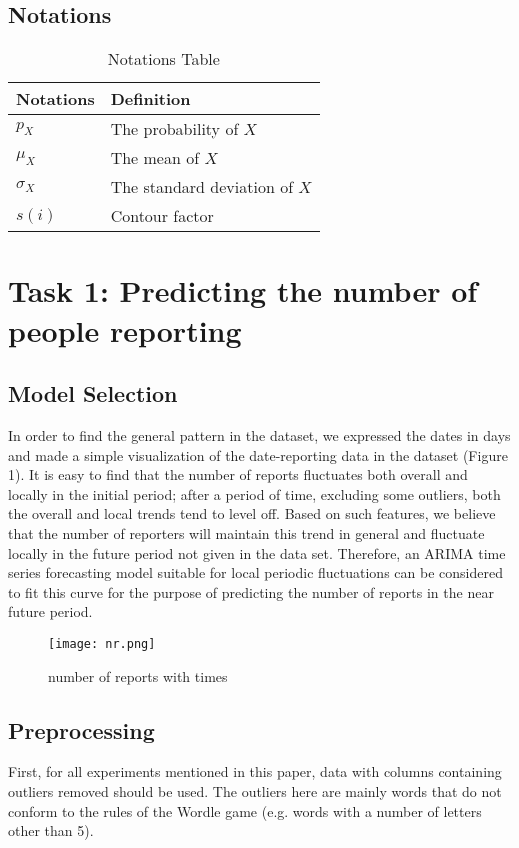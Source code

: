 \documentclass[12pt]{article}  %
\begin{document}
\subsection{Notations}
\begin{table}[H]
	\centering
	\begin{tabular}{ll}
		\hline
		\hline
		\multicolumn{1}{c}{\textbf{Notations}} & \textbf{Definition}\\ \hline
		$p_{X}$ &  The probability of $X$              \\                     
		$\mu_{X}$  & The mean of $X$              \\                     
		$\sigma_{X}$ &  The standard deviation of $X$              \\  
		$s(i)$ & Contour factor \\                   
		\hline
		\hline
	\end{tabular}
	\caption{Notations Table}
\end{table}
\section{Task 1: Predicting the number of people reporting}
\subsection{Model Selection}
In order to find the general pattern in the dataset, we expressed the dates in days and made a simple visualization of the date-reporting data in the dataset (Figure 1). It is easy to find that the number of reports fluctuates both overall and locally in the initial period; after a period of time, excluding some outliers, both the overall and local trends tend to level off. Based on such features, we believe that the number of reporters will maintain this trend in general and fluctuate locally in the future period not given in the data set. Therefore, an ARIMA time series forecasting model suitable for local periodic fluctuations can be considered to fit this curve for the purpose of predicting the number of reports in the near future period.

\begin{figure}[H]
	\centering
	\texttt{[image: nr.png]}
	\caption{number of reports with times}
	\label{img1}
\end{figure}

\subsection{Preprocessing}
First, for all experiments mentioned in this paper, data with columns containing outliers removed should be used. The outliers here are mainly words that do not conform to the rules of the Wordle game (e.g. words with a number of letters other than 5).
\end{document}
